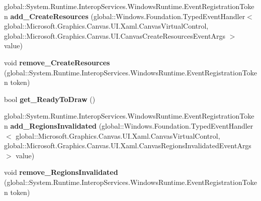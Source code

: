 \begin{DoxyCompactItemize}
global\+::\+System.\+Runtime.\+Interop\+Services.\+Windows\+Runtime.\+Event\+Registration\+Token {\bfseries add\+\_\+\+Create\+Resources} (global\+::\+Windows.\+Foundation.\+Typed\+Event\+Handler$<$ global\+::\+Microsoft.\+Graphics.\+Canvas.\+U\+I.\+Xaml.\+Canvas\+Virtual\+Control, global\+::\+Microsoft.\+Graphics.\+Canvas.\+U\+I.\+Canvas\+Create\+Resources\+Event\+Args $>$ value)
\item 
\mbox{\label{class_microsoft_1_1_graphics_1_1_canvas_1_1_u_i_1_1_xaml_1_1_canvas_virtual_control_a12628d4980246897d39f0971c3287ca0}} 
void {\bfseries remove\+\_\+\+Create\+Resources} (global\+::\+System.\+Runtime.\+Interop\+Services.\+Windows\+Runtime.\+Event\+Registration\+Token token)
\item 
\mbox{\label{class_microsoft_1_1_graphics_1_1_canvas_1_1_u_i_1_1_xaml_1_1_canvas_virtual_control_af6528db89b7f78c8130c559d594d8300}} 
bool {\bfseries get\+\_\+\+Ready\+To\+Draw} ()
\item 
\mbox{\label{class_microsoft_1_1_graphics_1_1_canvas_1_1_u_i_1_1_xaml_1_1_canvas_virtual_control_a4e2d94f4f40419484642f72168ab3bb1}} 
global\+::\+System.\+Runtime.\+Interop\+Services.\+Windows\+Runtime.\+Event\+Registration\+Token {\bfseries add\+\_\+\+Regions\+Invalidated} (global\+::\+Windows.\+Foundation.\+Typed\+Event\+Handler$<$ global\+::\+Microsoft.\+Graphics.\+Canvas.\+U\+I.\+Xaml.\+Canvas\+Virtual\+Control, global\+::\+Microsoft.\+Graphics.\+Canvas.\+U\+I.\+Xaml.\+Canvas\+Regions\+Invalidated\+Event\+Args $>$ value)
\item 
\mbox{\label{class_microsoft_1_1_graphics_1_1_canvas_1_1_u_i_1_1_xaml_1_1_canvas_virtual_control_a6ca7dfb4d3d175d3b2a55029b1f0f300}} 
void {\bfseries remove\+\_\+\+Regions\+Invalidated} (global\+::\+System.\+Runtime.\+Interop\+Services.\+Windows\+Runtime.\+Event\+Registration\+Token token)
\item 
\mbox{\label{class_microsoft_1_1_graphics_1_1_canvas_1_1_u_i_1_1_xaml_1_1_canvas_virtual_control_af130409d50f1c44d00f3db3c4c54e318}} 

\end{DoxyCompactItemize}
